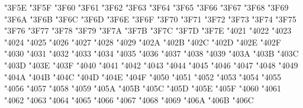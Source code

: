 {\Uchar\jis"3F5E %
\Uchar\jis"3F5F %
\Uchar\jis"3F60 %
\Uchar\jis"3F61 %
\Uchar\jis"3F62 %
\Uchar\jis"3F63 %
\Uchar\jis"3F64 %
\Uchar\jis"3F65 %
\Uchar\jis"3F66 %
\Uchar\jis"3F67 %
\Uchar\jis"3F68 %
\Uchar\jis"3F69 %
\Uchar\jis"3F6A %
\Uchar\jis"3F6B %
\Uchar\jis"3F6C %
\Uchar\jis"3F6D %
\Uchar\jis"3F6E %
\Uchar\jis"3F6F %
\Uchar\jis"3F70 %
\Uchar\jis"3F71 %
\Uchar\jis"3F72 %
\Uchar\jis"3F73 %
\Uchar\jis"3F74 %
\Uchar\jis"3F75 %
\Uchar\jis"3F76 %
\Uchar\jis"3F77 %
\Uchar\jis"3F78 %
\Uchar\jis"3F79 %
\Uchar\jis"3F7A %
\Uchar\jis"3F7B %
\Uchar\jis"3F7C %
\Uchar\jis"3F7D %
\Uchar\jis"3F7E %
\Uchar\jis"4021 %
\Uchar\jis"4022 %
\Uchar\jis"4023 %
\Uchar\jis"4024 %
\Uchar\jis"4025 %
\Uchar\jis"4026 %
\Uchar\jis"4027 %
\Uchar\jis"4028 %
\Uchar\jis"4029 %
\Uchar\jis"402A %
\Uchar\jis"402B %
\Uchar\jis"402C %
\Uchar\jis"402D %
\Uchar\jis"402E %
\Uchar\jis"402F %
\Uchar\jis"4030 %
\Uchar\jis"4031 %
\Uchar\jis"4032 %
\Uchar\jis"4033 %
\Uchar\jis"4034 %
\Uchar\jis"4035 %
\Uchar\jis"4036 %
\Uchar\jis"4037 %
\Uchar\jis"4038 %
\Uchar\jis"4039 %
\Uchar\jis"403A %
\Uchar\jis"403B %
\Uchar\jis"403C %
\Uchar\jis"403D %
\Uchar\jis"403E %
\Uchar\jis"403F %
\Uchar\jis"4040 %
\Uchar\jis"4041 %
\Uchar\jis"4042 %
\Uchar\jis"4043 %
\Uchar\jis"4044 %
\Uchar\jis"4045 %
\Uchar\jis"4046 %
\Uchar\jis"4047 %
\Uchar\jis"4048 %
\Uchar\jis"4049 %
\Uchar\jis"404A %
\Uchar\jis"404B %
\Uchar\jis"404C %
\Uchar\jis"404D %
\Uchar\jis"404E %
\Uchar\jis"404F %
\Uchar\jis"4050 %
\Uchar\jis"4051 %
\Uchar\jis"4052 %
\Uchar\jis"4053 %
\Uchar\jis"4054 %
\Uchar\jis"4055 %
\Uchar\jis"4056 %
\Uchar\jis"4057 %
\Uchar\jis"4058 %
\Uchar\jis"4059 %
\Uchar\jis"405A %
\Uchar\jis"405B %
\Uchar\jis"405C %
\Uchar\jis"405D %
\Uchar\jis"405E %
\Uchar\jis"405F %
\Uchar\jis"4060 %
\Uchar\jis"4061 %
\Uchar\jis"4062 %
\Uchar\jis"4063 %
\Uchar\jis"4064 %
\Uchar\jis"4065 %
\Uchar\jis"4066 %
\Uchar\jis"4067 %
\Uchar\jis"4068 %
\Uchar\jis"4069 %
\Uchar\jis"406A %
\Uchar\jis"406B %
\Uchar\jis"406C %
}
